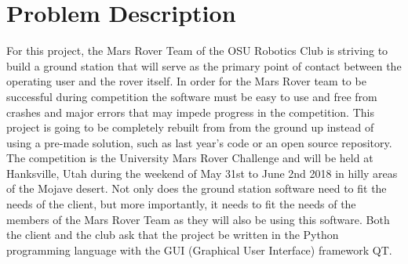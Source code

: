 \documentclass[onecolumn, draftclsnofoot, 10pt, compsoc]{IEEEtran}
\begin{document}
\section{Problem Description}\par
For this project, the Mars Rover Team of the OSU Robotics Club is striving to build a ground station that will serve as the primary point of contact between the operating user and the rover itself.
In order for the Mars Rover team to be successful during competition the software must be easy to use and free from crashes and major errors that may impede progress in the competition.
This project is going to be completely rebuilt from from the ground up instead of using a pre-made solution, such as last year's code or an open source repository.
The competition is the University Mars Rover Challenge and will be held at Hanksville, Utah during the weekend of May 31st to June 2nd 2018 in hilly areas of the Mojave desert.
Not only does the ground station software need to fit the needs of the client, but more importantly, it needs to fit the needs of the members of the Mars Rover Team as they will also be using this software. 
Both the client and the club ask that the project be written in the Python programming language with the GUI (Graphical User Interface) framework QT.
\end{document}
